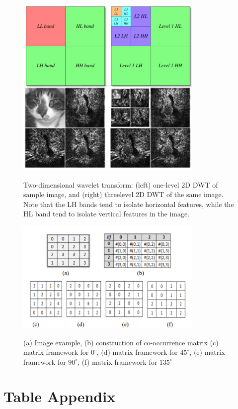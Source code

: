 \documentclass{article}
\begin{document}
	\FloatBarrier
	\begin{figure}[t]
		\caption{Two-dimensional wavelet transform: (left) one-level 2D DWT of sample image, and (right) threelevel 2D DWT of the same image. Note that the LH bands tend to isolate horizontal features, while the HL band tend to isolate vertical features in the image.}
		\centering
		\includegraphics[width=0.8\textwidth]{imgs/multi-level-2-dwt}
		\label{fig:multi-level-2-dwt}
	\end{figure}
	\FloatBarrier
	\begin{figure}[t]
		\caption{(a) Image example, (b) construction of co-occurrence matrix (c)	matrix framework for $0^{\circ}$, (d) matrix framework for $45^{\circ}$, (e) matrix framework for $90^{\circ}$, (f) matrix framework for $135^{\circ}$}
		\centering
		\includegraphics[width=0.8\textwidth]{imgs/glcm}
		\label{fig:glcm}
	\end{figure}
	\FloatBarrier
	\section{Table Appendix}
	\FloatBarrier
\end{document}
